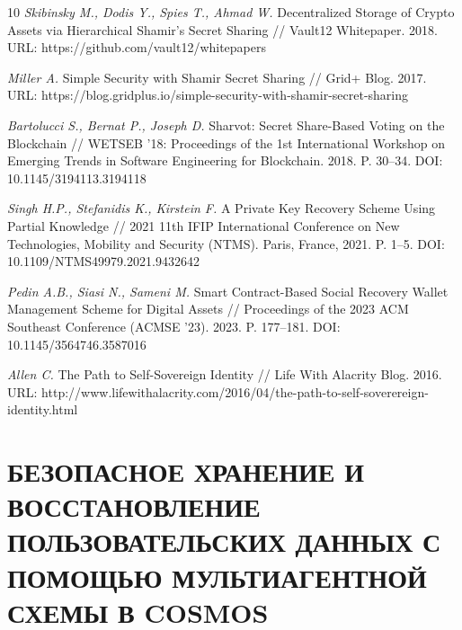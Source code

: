 \documentclass[12pt]{a&t}
\begin{document}
\begin{thebibliography}{10}
{\it Skibinsky M., Dodis Y., Spies T., Ahmad W.}
Decentralized Storage of Crypto Assets via Hierarchical Shamir's Secret Sharing // 
Vault12 Whitepaper. 2018. URL: https://github.com/vault12/whitepapers

{\it Miller A.}
Simple Security with Shamir Secret Sharing // 
Grid+ Blog. 2017. URL: https://blog.gridplus.io/simple-security-with-shamir-secret-sharing

{\it Bartolucci S., Bernat P., Joseph D.}
Sharvot: Secret Share-Based Voting on the Blockchain // 
WETSEB '18: Proceedings of the 1st International Workshop on Emerging Trends in Software Engineering for Blockchain. 2018. P. 30--34. DOI: 10.1145/3194113.3194118

{\it Singh H.P., Stefanidis K., Kirstein F.}
A Private Key Recovery Scheme Using Partial Knowledge // 
2021 11th IFIP International Conference on New Technologies, Mobility and Security (NTMS). Paris, France, 2021. P. 1--5. DOI: 10.1109/NTMS49979.2021.9432642

{\it Pedin A.B., Siasi N., Sameni M.}
Smart Contract-Based Social Recovery Wallet Management Scheme for Digital Assets // 
Proceedings of the 2023 ACM Southeast Conference (ACMSE '23). 2023. P. 177--181. DOI: 10.1145/3564746.3587016

{\it Allen C.}
The Path to Self-Sovereign Identity // 
Life With Alacrity Blog. 2016. URL: http://www.lifewithalacrity.com/2016/04/the-path-to-self-soverereign-identity.html

\end{thebibliography}




\section*{БЕЗОПАСНОЕ ХРАНЕНИЕ И ВОССТАНОВЛЕНИЕ ПОЛЬЗОВАТЕЛЬСКИХ ДАННЫХ С ПОМОЩЬЮ МУЛЬТИАГЕНТНОЙ СХЕМЫ В COSMOS}
\end{document}
